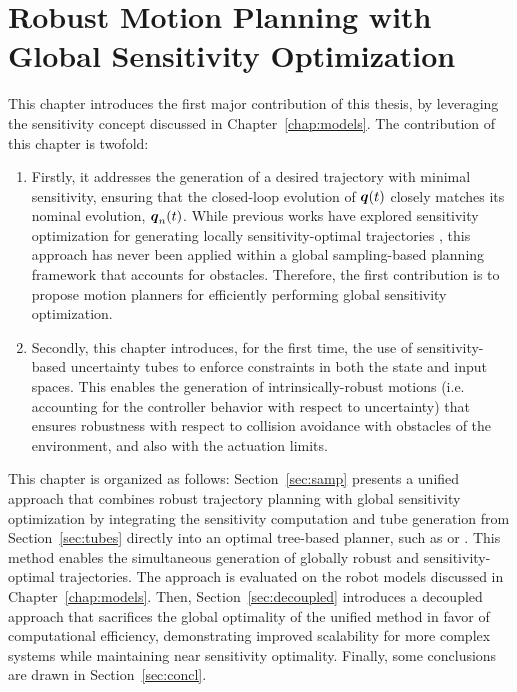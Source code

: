 \chapter{Robust Motion Planning with Global Sensitivity Optimization}\label{chap:samp}


This chapter introduces the first major contribution of this thesis, by leveraging the sensitivity concept discussed in Chapter~\ref{chap:models}.
The contribution of this chapter is twofold:
\begin{enumerate}
    \item Firstly, it addresses the generation of a desired trajectory with minimal sensitivity, ensuring that the closed-loop evolution of $\boldsymbol{q}(t)$ closely matches its nominal evolution, $\boldsymbol{q}_n(t)$. 
    While previous works have explored sensitivity optimization for generating locally sensitivity-optimal trajectories \cite{cPi,cTh}, this approach has never been applied within a global sampling-based planning framework that accounts for obstacles. 
    Therefore, the first contribution is to propose motion planners for efficiently performing global sensitivity optimization.
    \item Secondly, this chapter introduces, for the first time, the use of sensitivity-based uncertainty tubes to enforce constraints in both the state and input spaces. 
    This enables the generation of intrinsically-robust motions (i.e. accounting for the controller behavior with respect to uncertainty) that ensures robustness with respect to collision avoidance with obstacles of the environment, and also with the actuation limits.
\end{enumerate}
This chapter is organized as follows: Section~\ref{sec:samp} presents a unified approach that combines robust trajectory planning with global sensitivity optimization by integrating the sensitivity computation and tube generation from Section~\ref{sec:tubes} directly into an optimal tree-based planner, such as  or . 
This method enables the simultaneous generation of globally robust and sensitivity-optimal trajectories. 
The approach is evaluated on the robot models discussed in Chapter~\ref{chap:models}.
Then, Section~\ref{sec:decoupled} introduces a decoupled approach that sacrifices the global optimality of the unified method in favor of computational efficiency, demonstrating improved scalability for more complex systems while maintaining near sensitivity optimality.
Finally, some conclusions are drawn in Section~\ref{sec:concl}.

